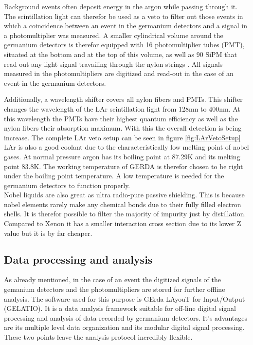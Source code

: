 \documentclass[encoding=utf8,british]{tumphthesis}
\begin{document}
Background events often deposit energy in the argon while passing through it.
The scintillation light can therefor be used as a veto to filter out those events in which a coincidence between an event in the germanium detectors and a signal in a photomultiplier was measured.
A smaller cylindrical volume around the germanium detectors is therefor equipped with 16 photomultiplier tubes (PMT), situated at the bottom and at the top of this volume, as well as 90 SiPM that read out any light signal travailing through the nylon strings \cite{csathy_optical_2016}.
All signals measured in the photomultipliers are digitized and read-out in the case of an event in the germanium detectors.

Additionally, a wavelength shifter covers all nylon fibers and PMTs.
This shifter changes the wavelength of the LAr scintillation light from 128mn to 400nm.
At this wavelength the PMTs have their highest quantum efficiency as well as the nylon fibers their absorption maximum.
With this the overall detection is being increase.
The complete LAr veto setup can be seen in figure \ref{fig:LArVetoSetup}
\\

LAr is also a good coolant due to the characteristically low melting point of nobel gases.
At normal pressure argon has its boiling point at 87.29K and its melting point 83.8K.
The working temperature of GERDA is therefor chosen to be right under the boiling point temperature.
A low temperature is needed for the germanium detectors to function properly.
\\

Nobel liquids are also great as ultra radio-pure passive shielding.
This is because nobel elements rarely make any chemical bonds due to their fully filled electron shells.
It is therefor possible to filter the majority of impurity just by distillation.
Compared to Xenon it has a smaller interaction cross section due to its lower Z value but it is by far cheaper.
\\

\subsection{Data processing and analysis}
\label{sec:DataProc}

As already mentioned, in the case of an event the digitized signals of the gemanium detectors and the photomultipliers are stored for further offline analysis.
The software used for this purpose is GErda LAyouT for Input/Output (GELATIO).
It is a data analysis framework suitable for off-line digital signal processing and analysis of data recorded by germanium detectors.
It's advantages are its multiple level data organization and its modular digital signal processing.
These two points leave the analysis protocol incredibly flexible.
\\
\end{document}
